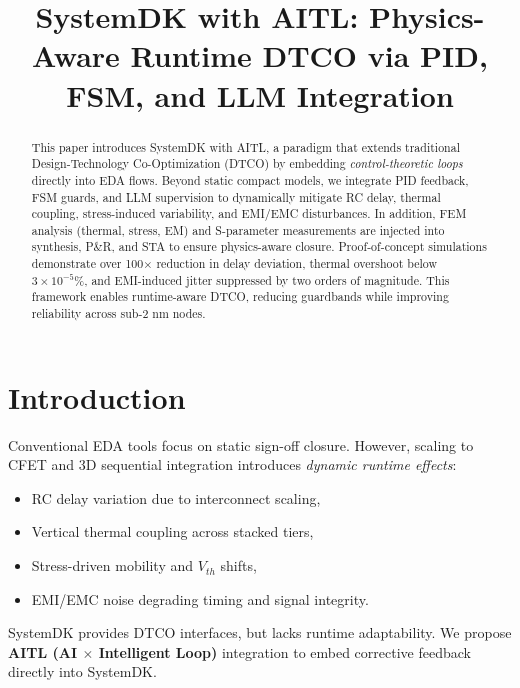 \documentclass[conference]{IEEEtran}
\begin{document}
\title{SystemDK with AITL: Physics-Aware Runtime DTCO via PID, FSM, and LLM Integration}

\author{
}

\maketitle

\begin{abstract}
This paper introduces SystemDK with AITL,
a paradigm that extends traditional Design-Technology Co-Optimization (DTCO) 
by embedding \textit{control-theoretic loops} directly into EDA flows. 
Beyond static compact models, we integrate PID feedback, FSM guards, and LLM supervision to dynamically mitigate RC delay, thermal coupling, stress-induced variability, and EMI/EMC disturbances. 
In addition, FEM analysis (thermal, stress, EM) and S-parameter measurements are injected into synthesis, P\&R, and STA to ensure physics-aware closure. 
Proof-of-concept simulations demonstrate over 100$\times$ reduction in delay deviation, thermal overshoot below $3 \times 10^{-5}\%$, and EMI-induced jitter suppressed by two orders of magnitude. 
This framework enables runtime-aware DTCO, reducing guardbands while improving reliability across sub-2 nm nodes.
\end{abstract}

\section{Introduction}
Conventional EDA tools focus on static sign-off closure. 
However, scaling to CFET and 3D sequential integration introduces \textit{dynamic runtime effects}:
\begin{itemize}
    \item RC delay variation due to interconnect scaling,
    \item Vertical thermal coupling across stacked tiers,
    \item Stress-driven mobility and $V_{th}$ shifts,
    \item EMI/EMC noise degrading timing and signal integrity.
\end{itemize}

SystemDK provides DTCO interfaces, but lacks runtime adaptability. 
We propose \textbf{AITL (AI $\times$ Intelligent Loop)} integration to embed corrective feedback directly into SystemDK.
\end{document}
